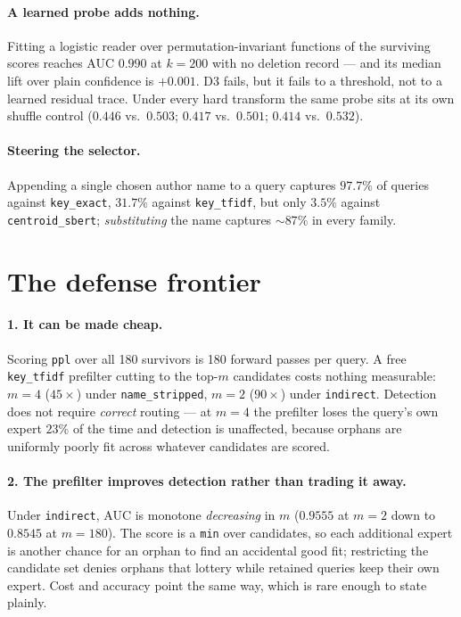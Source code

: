 \documentclass{article}
\begin{document}
\paragraph{A learned probe adds nothing.} Fitting a logistic reader over permutation-invariant
functions of the surviving scores reaches AUC $0.990$ at $k=200$ with no deletion record --- and its
median lift over plain confidence is $+0.001$. D3 fails, but it fails to a threshold, not to a
learned residual trace. Under every hard transform the same probe sits at its own shuffle control
($0.446$ vs.\ $0.503$; $0.417$ vs.\ $0.501$; $0.414$ vs.\ $0.532$).

\paragraph{Steering the selector.} Appending a single chosen author name to a query captures
$97.7\%$ of queries against \texttt{key\_exact}, $31.7\%$ against \texttt{key\_tfidf}, but only
$3.5\%$ against \texttt{centroid\_sbert}; \emph{substituting} the name captures ${\sim}87\%$ in
every family.

\section{The defense frontier}
\label{app:defense}

\paragraph{1. It can be made cheap.} Scoring \texttt{ppl} over all 180 survivors is 180 forward
passes per query. A free \texttt{key\_tfidf} prefilter cutting to the top-$m$ candidates costs
nothing measurable: $m=4$ ($45\times$) under \texttt{name\_stripped}, $m=2$ ($90\times$) under
\texttt{indirect}. Detection does not require \emph{correct} routing --- at $m=4$ the prefilter
loses the query's own expert $23\%$ of the time and detection is unaffected, because orphans are
uniformly poorly fit across whatever candidates are scored.

\paragraph{2. The prefilter improves detection rather than trading it away.} Under
\texttt{indirect}, AUC is monotone \emph{decreasing} in $m$ ($0.9555$ at $m=2$ down to $0.8545$ at
$m=180$). The score is a \texttt{min} over candidates, so each additional expert is another chance
for an orphan to find an accidental good fit; restricting the candidate set denies orphans that
lottery while retained queries keep their own expert. Cost and accuracy point the same way, which
is rare enough to state plainly.
\end{document}
